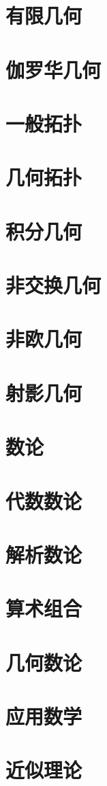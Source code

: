 \section{有限几何}
\section{伽罗华几何}
\section{一般拓扑}
\section{几何拓扑}
\section{积分几何}
\section{非交换几何}
\section{非欧几何}
\section{射影几何}
\section{数论}
\section{代数数论}
\section{解析数论}
\section{算术组合}
\section{几何数论}
\section{应用数学}
\section{近似理论}
